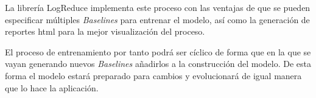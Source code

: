 La librería LogReduce implementa este proceso con las ventajas de que se pueden especificar múltiples \textit{Baselines} para entrenar el modelo, así como la generación de reportes html para la mejor visualización del proceso.

El proceso de entrenamiento por tanto podrá ser cíclico de forma que en la que se vayan generando nuevos \textit{Baselines} añadirlos a la construcción del modelo. De esta forma el modelo estará preparado para cambios y evolucionará de igual manera que lo hace la aplicación. 

